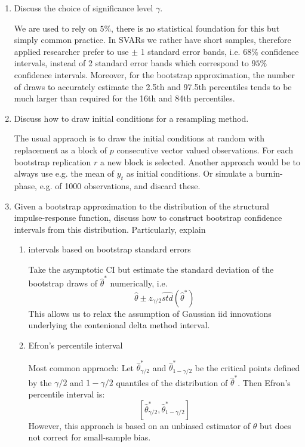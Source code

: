 \documentclass[a4paper]{scrartcl}
\begin{document}
\begin{enumerate}
\begin{solution}
	\end{solution}
	\item Discuss the choice of significance level $\gamma$.
	\begin{solution}
		We are used to rely on $5\%$, there is no statistical foundation for this but simply common practice. In SVARs we rather have short samples, therefore applied researcher prefer to use $\pm$ 1 standard error bands, i.e. $68\%$ confidence intervals, instead of 2 standard error bands which correspond to $95\%$ confidence intervals. Moreover, for the bootstrap approximation, the number of draws to accurately estimate the 2.5th and 97.5th percentiles tends to be much larger than required for the 16th and 84th percentiles.
	\end{solution}
	\item Discuss how to draw initial conditions for a resampling method.
	\begin{solution}
		The usual appraoch is to draw the initial conditions at random with replacement as a block of $p$ consecutive vector valued observations. For each bootstrap replication $r$ a new block is selected. Another approach would be to always use e.g. the mean of $y_t$ as initial conditions. Or simulate a burnin-phase, e.g. of 1000 observations, and discard these.
	\end{solution}
	\item Given a bootstrap approximation to the distribution of the structural impulse-response function, discuss how to construct bootstrap confidence intervals from this distribution. Particularly, explain
	\begin{enumerate}
		\item intervals based on bootstrap standard errors
		\begin{solution}
			Take the asymptotic CI but estimate the standard deviation of the bootstrap draws of $\hat{\theta}^\ast$ numerically, i.e.
			$$\hat{\theta} \pm z_{\gamma/2} \widehat{std}(\hat{\theta}^\ast)$$
			This allows us to relax the assumption of Gaussian iid innovations underlying the contenional delta method interval.
		\end{solution}
		\item Efron's percentile interval
		\begin{solution}
			Most common appraoch: Let $\hat{\theta}^\ast_{\gamma/2}$ and $\hat{\theta}^\ast_{1-\gamma/2}$ be the critical points defined by the $\gamma/2$ and $1-\gamma/2$ quantiles of the distribution of $\hat{\theta}^\ast$. Then Efron's percentile interval is:
			$$[\hat{\theta}^\ast_{\gamma/2},\hat{\theta}^\ast_{1-\gamma/2}]$$ However, this approach is based on an unbiased estimator of $\theta$ but does not correct for small-sample bias.

\end{solution}
\end{enumerate}
\end{enumerate}
\end{document}
